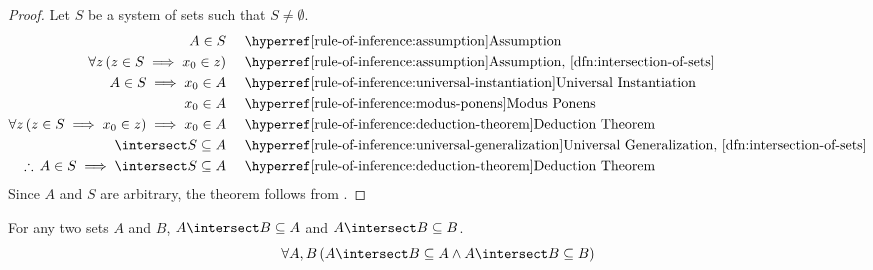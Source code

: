 \begin{proof}
    Let \( S \) be a system of sets such that \( S \neq \emptyset \).
    \begin{equation*}
        \begin{aligned}
            A \in S& \\
            \forall z \, \mleft( z \in S \implies x_{0} \in z \mright)&\\
            A \in S \implies x_{0} \in A& \\
            x_{0} \in A& \\
            \forall z \, \mleft( z \in S \implies x_{0} \in z \mright) \implies
            x_{0} \in A& \\
            \intersect S \subseteq A& \\
            \therefore \, A \in S \implies \intersect S \subseteq A& \\
        \end{aligned}
        \text{  }
        \begin{aligned}
            &\quad\text{\aref{rule-of-inference:assumption}{Assumption}}\\
            &\quad\text{\aref{rule-of-inference:assumption}{Assumption}, \cref{dfn:intersection-of-sets}}\\
            &\quad\text{\aref{rule-of-inference:universal-instantiation}{Universal Instantiation}}\\
            &\quad\text{\aref{rule-of-inference:modus-ponens}{Modus Ponens}}\\
            &\quad\text{\aref{rule-of-inference:deduction-theorem}{Deduction Theorem}}\\
            &\quad\text{\aref{rule-of-inference:universal-generalization}{Universal Generalization}, \cref{dfn:intersection-of-sets}}\\
            &\quad\text{\aref{rule-of-inference:deduction-theorem}{Deduction Theorem}}
        \end{aligned}
    \end{equation*}
    Since \( A \) and \( S \) are arbitrary, the theorem follows from .
\end{proof}

\begin{thm}
    \label{thm:the-intersection-of-two-sets-is-a-subset-of-each-set}
    For any two sets \( A \) and \( B \), \( A \intersect B \subseteq A \) and
    \( A \intersect B \subseteq B \).
    \begin{equation*}
        \forall A,B \, \mleft( A \intersect B \subseteq A \land A \intersect B \subseteq B \mright)
    \end{equation*}
\end{thm}


